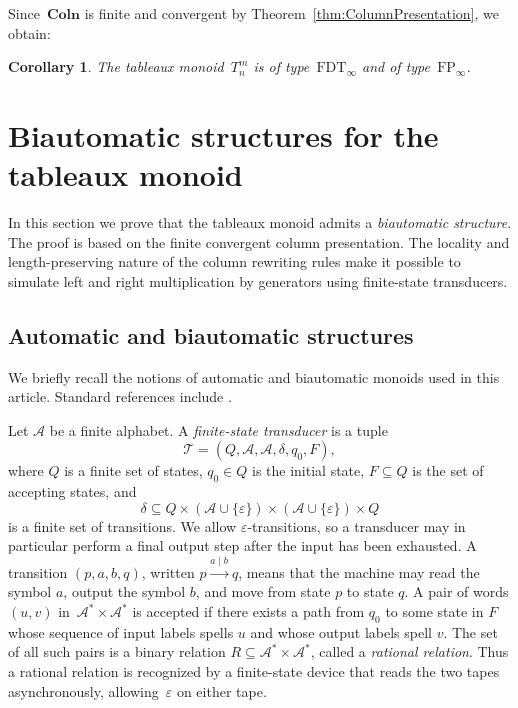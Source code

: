 \documentclass[a4paper, twoside, 11pt, english]{article}
\theoremstyle{plain}
\newtheorem{corollary}[subsubsection]{Corollary}
\theoremstyle{definition}
\newcommand{\Ar}{\EuScript{A}}
\newcommand{\Colo}{\mathbf{Coln}}
\def\Ar{\mathcal{A}}
\begin{document}
Since~$\Colo$ is finite and convergent by
Theorem~\ref{thm:ColumnPresentation}, we obtain:

\begin{corollary}
\label{Corollary:FP-FDT}
The tableaux monoid~$T_n^m$ is of type~$\mathrm{FDT}_\infty$ and of type~$\mathrm{FP}_\infty$.
\end{corollary}




\section{Biautomatic structures for the tableaux monoid}
\label{S:BiautomaticStructuresTableauxMonoid}

In this section we prove that the tableaux monoid admits a
\emph{biautomatic structure}.
The proof is based on the finite convergent column presentation.
The locality and length-preserving nature of the column rewriting
rules make it possible to simulate left and right multiplication by
generators using finite-state transducers.


\subsection{Automatic and biautomatic structures}
\label{SS:Automaticity}

We briefly recall the notions of automatic and biautomatic monoids
used in this article. Standard references include
\cite{DuncanRobertsonRuskuc99,CainGrayMalheiro19,CainGrayMalheiro15b}.

Let $\Ar$ be a finite alphabet.
A \emph{finite-state transducer} is a tuple
\[
\mathcal T = (Q,\Ar,\Ar,\delta,q_0,F),
\]
where $Q$ is a finite set of states, $q_0\in Q$ is the initial state,
$F\subseteq Q$ is the set of accepting states, and
\[
\delta \subseteq Q\times (\Ar\cup\{\varepsilon\})
\times (\Ar\cup\{\varepsilon\})\times Q
\]
is a finite set of transitions.
We allow $\varepsilon$-transitions, so a transducer may in particular perform a final output step after the input has been exhausted.
A transition $(p,a,b,q)$, written
$p \xrightarrow{a\mid b} q$,
means that the machine may read the symbol $a$, output the symbol $b$,
and move from state $p$ to state $q$.
A pair of words $(u,v)$ in~$\Ar^*\times\Ar^*$ is accepted if
there exists a path from $q_0$ to some state in $F$
whose sequence of input labels spells $u$ and whose output labels spell $v$.
The set of all such pairs is a binary relation
$R\subseteq\Ar^*\times\Ar^*$,
called a \emph{rational relation}.
Thus a rational relation is recognized by a finite-state device that reads
the two tapes asynchronously, allowing~$\varepsilon$ on either tape.
\end{document}

